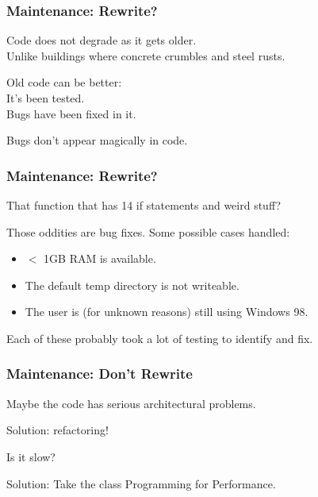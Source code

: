 \begin{frame}
\frametitle{Maintenance: Rewrite?}
\begin{changemargin}{1cm}

Code does not degrade as it gets older.\\
	\quad Unlike buildings where concrete crumbles and steel rusts.

Old code can be better:\\
	\quad It's been tested.\\
	\quad Bugs have been fixed in it.

Bugs don't appear magically in code.

\end{changemargin}
\end{frame}

\begin{frame}
\frametitle{Maintenance: Rewrite?}
\begin{changemargin}{1cm}

That function that has 14 if statements and weird stuff?

Those oddities are bug fixes. Some possible cases handled:
\begin{itemize}
	\item $<$ 1GB RAM is available.
	\item The default temp directory is not writeable.
	\item The user is (for unknown reasons) still using Windows 98.
\end{itemize}

Each of these probably took a lot of testing to identify and fix.

\end{changemargin}
\end{frame}


\begin{frame}
\frametitle{Maintenance: Don't Rewrite}
\begin{changemargin}{1cm}

Maybe the code has serious architectural problems.

Solution: refactoring!

Is it slow? 

Solution: Take the class Programming for Performance.


\end{changemargin}
\end{frame}

